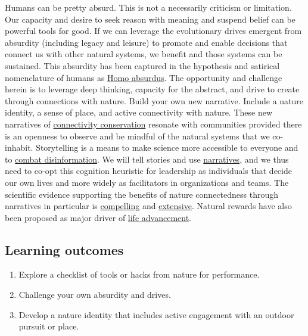 \documentclass[
]{book}
\providecommand{\tightlist}{%
  \setlength{\itemsep}{0pt}\setlength{\parskip}{0pt}}
\begin{document}
Humans can be pretty absurd. This is not a necessarily criticism or limitation. Our capacity and desire to seek reason with meaning and suspend belief can be powerful tools for good. If we can leverage the evolutionary drives emergent from absurdity (including legacy and leisure) to promote and enable decisions that connect us with other natural systems, we benefit and those systems can be sustained. This absurdity has been captured in the hypothesis and satirical nomenclature of humans as \href{https://ojs.library.queensu.ca/index.php/IEE/article/view/13137}{Homo absurdus}. The opportunity and challenge herein is to leverage deep thinking, capacity for the abstract, and drive to create through connections with nature. Build your own new narrative. Include a nature identity, a sense of place, and active connectivity with nature. These new narratives of \href{https://www.sciencedirect.com/science/article/abs/pii/S1462901115000921}{connectivity conservation} resonate with communities provided there is an openness to observe and be mindful of the natural systems that we co-inhabit. Storytelling is a means to make science more accessible to everyone and to \href{https://www.pnas.org/content/118/15/e1914085117}{combat disinformation}. We will tell stories and use \href{https://www.jstor.org/stable/20107373?seq=1\#metadata_info_tab_contents}{narratives}, and we thus need to co-opt this cognition heuristic for leadership as individuals that decide our own lives and more widely as facilitators in organizations and teams. The scientific evidence supporting the benefits of nature connectedness through narratives in particular is \href{https://journals.sagepub.com/doi/full/10.1177/2158244019841925}{compelling} and \href{https://www.semanticscholar.org/paper/Mindfulness-and-connectedness-to-nature\%3A-A-Schutte-Malouff/8e1c1d5767b01a9f453354767168e85bd629d507}{extensive}. Natural rewards have also been proposed as major driver of \href{https://rethinkingecology.pensoft.net/article/58518/}{life advancement}.

\hypertarget{learning-outcomes-1}{%
\subsection*{Learning outcomes}\label{learning-outcomes-1}}

\begin{enumerate}
\def\labelenumi{\arabic{enumi}.}
\tightlist
\item
  Explore a checklist of tools or hacks from nature for performance.\\
\item
  Challenge your own absurdity and drives.\\
\item
  Develop a nature identity that includes active engagement with an outdoor pursuit or place.
\end{enumerate}
\end{document}
